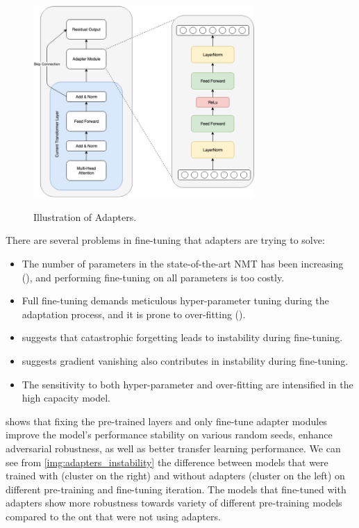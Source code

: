 \begin{figure}[h]
    {\includegraphics[width=0.75\textwidth]{img/adapter_module.png}}
    \centering
    \caption{Illustration of Adapters.}
    \label{img:adapters}
\end{figure}

There are several problems in fine-tuning that adapters are trying to solve:
\begin{itemize}
    \item The number of parameters in the state-of-the-art NMT has been increasing (\cite{Shazeer2018MeshTensorFlowDL,Bapna2018TrainingDN,Huang2019GPipeET}), and performing fine-tuning on all parameters is too costly.
    \item Full fine-tuning demands meticulous hyper-parameter tuning during the adaptation process, and it is prone to over-fitting (\cite{Sennrich2016ImprovingNM,Barone2017RegularizationTF}).
    \item \cite{Lee2020MixoutER} suggests that catastrophic forgetting leads to instability during fine-tuning.
    \item \cite{Mosbach2021OnTS} suggests gradient vanishing also contributes in instability during fine-tuning.
    \item The sensitivity to both hyper-parameter and over-fitting are intensified in the high capacity model.
\end{itemize}

\cite{han2021robust} shows that fixing the pre-trained layers and only fine-tune adapter modules improve the model's performance stability on various random seeds, enhance adversarial robustness, as well as better transfer learning performance. We can see from \cref{img:adapters_instability} the difference between models that were trained with (cluster on the right) and without adapters (cluster on the left) on different pre-training and fine-tuning iteration. The models that fine-tuned with adapters show more robustness towards variety of different pre-training models compared to the ont that were not using adapters.


